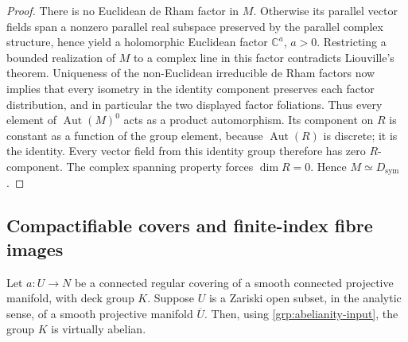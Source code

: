 \begin{proof}
There is no Euclidean de Rham factor in $M$.  Otherwise its parallel
vector fields span a nonzero parallel real subspace preserved by the
parallel complex structure, hence yield a holomorphic Euclidean factor
$\mathbb C^a$, $a>0$.  Restricting a bounded realization of $M$ to a
complex line in this factor contradicts Liouville's theorem.  Uniqueness
of the non-Euclidean irreducible de Rham factors
\cite[\S7, Th\'eor\`eme~III]{DeRham1952} now implies that every
isometry in the identity component preserves each factor distribution,
and in particular the two displayed factor foliations.  Thus every
element of $\operatorname{Aut}(M)^0$ acts as a product automorphism.
Its component on $R$ is constant as a function of the group element,
because $\operatorname{Aut}(R)$ is discrete; it is the identity.
Every vector field from this identity group therefore has zero
$R$-component.  The complex spanning property forces $\dim R=0$.
Hence $M\simeq D_{\mathrm{sym}}$.
\end{proof}

\subsection{Compactifiable covers and finite-index fibre images}

\begin{lemma}\label{grp:compactifiable-cover}
Let $a:U\to N$ be a connected regular covering of a smooth connected
projective manifold, with deck group $K$.  Suppose $U$ is a Zariski open
subset, in the analytic sense, of a smooth projective manifold $\overline U$.
Then, using \eqref{grp:abelianity-input}, the group $K$ is virtually
abelian.
\end{lemma}

